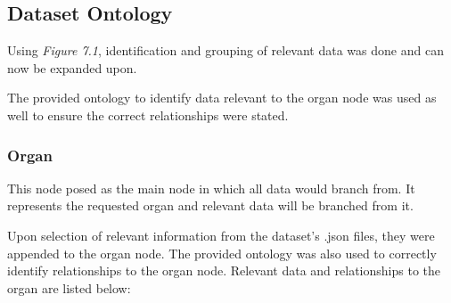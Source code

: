 \subsection{Dataset Ontology}
\hspace*{0.5cm} Using \textit{Figure 7.1}, identification and grouping of relevant data was done and can now be expanded upon. 

The provided ontology to identify data relevant to the organ node was used as well to ensure the correct relationships were stated.

\subsubsection{Organ}
\hspace*{0.5cm} This node posed as the main node in which all data would branch from. It represents the requested organ and relevant data will be branched from it. 

Upon selection of relevant information from the dataset's .json files, they were appended to the organ node. The provided ontology was also used to correctly identify relationships to the organ node. Relevant data and relationships to the organ are listed below:

